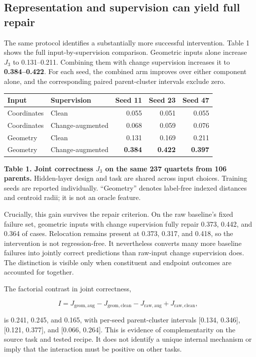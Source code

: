 \hypertarget{representation-and-supervision-can-yield-full-repair}{%
\subsection{Representation and supervision can yield full repair}\label{representation-and-supervision-can-yield-full-repair}}

The same protocol identifies a substantially more successful intervention. Table 1 shows the full input-by-supervision comparison. Geometric inputs alone increase \(J_3\) to 0.131--0.211. Combining them with change supervision increases it to \textbf{0.384--0.422}. For each seed, the combined arm improves over either component alone, and the corresponding paired parent-cluster intervals exclude zero.

\begin{longtable}[]{@{}llrrr@{}}
\toprule
Input & Supervision & Seed 11 & Seed 23 & Seed 47\tabularnewline
\midrule
\endhead
Coordinates & Clean & 0.055 & 0.051 & 0.055\tabularnewline
Coordinates & Change-augmented & 0.068 & 0.059 & 0.076\tabularnewline
Geometry & Clean & 0.131 & 0.169 & 0.211\tabularnewline
Geometry & Change-augmented & \textbf{0.384} & \textbf{0.422} & \textbf{0.397}\tabularnewline
\bottomrule
\end{longtable}

\textbf{Table 1. Joint correctness \(J_3\) on the same 237 quartets from 106 parents.} Hidden-layer design and task are shared across input choices. Training seeds are reported individually. ``Geometry'' denotes label-free indexed distances and centroid radii; it is not an oracle feature.

Crucially, this gain survives the repair criterion. On the raw baseline's fixed failure set, geometric inputs with change supervision fully repair 0.373, 0.442, and 0.364 of cases. Relocation remains present at 0.373, 0.317, and 0.418, so the intervention is not regression-free. It nevertheless converts many more baseline failures into jointly correct predictions than raw-input change supervision does. The distinction is visible only when constituent and endpoint outcomes are accounted for together.

The factorial contrast in joint correctness,

\[
I=J_{\mathrm{geom,aug}}-J_{\mathrm{geom,clean}}-J_{\mathrm{raw,aug}}+J_{\mathrm{raw,clean}},
\]

is 0.241, 0.245, and 0.165, with per-seed parent-cluster intervals {[}0.134, 0.346{]}, {[}0.121, 0.377{]}, and {[}0.066, 0.264{]}. This is evidence of complementarity on the source task and tested recipe. It does not identify a unique internal mechanism or imply that the interaction must be positive on other tasks.

